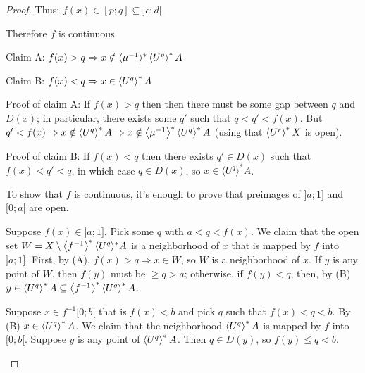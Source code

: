 \begin{proof}
Thus: $f(x)\in[p;q]\subseteq]c;d[$.

Therefore $f$ is continuous.

\begin{grayed}
Claim A: $f (x) > q \Rightarrow x \notin \langle \mu^{- 1}
\rangle^{\ast} \left\langle U^q\right\rangle ^{\ast} A$

Claim B: $f (x) < q \Rightarrow x \in \left\langle U^q\right\rangle ^{\ast} A$

Proof of claim A: If $f (x) > q$ then then there must be some gap between $q$
and $D (x)$; in particular, there exists some $q'$ such that $q < q' < f (x)$.
But $q' < f (x) \Rightarrow x \notin \left\langle U^q\right\rangle ^{\ast} A \Rightarrow x
\notin \left\langle \mu^{- 1}\right\rangle ^{\ast} \left\langle U^q\right\rangle ^{\ast} A$ (using that $\left\langle U^r\right\rangle ^{\ast}X$ is open).

Proof of claim B: If $f (x) < q$ then there exists $q' \in D (x)$ such that $f
(x) < q' < q$, in which case $q \in D (x)$, so $x \in \langle U^q
\rangle^{\ast} A$.

To show that $f$ is continuous, it's enough to prove that preimages of $] a ;
1]$ and $[0 ; a [$ are open.

Suppose $f (x) \in] a ; 1]$. Pick some $q$ with $a < q < f (x)$. We claim that
the open set $W = X \setminus \left\langle f^{- 1}\right\rangle ^{\ast} \langle U^q
\rangle^{\ast} A$ is a neighborhood of $x$ that is mapped by $f$ into $] a ;
1]$. First, by (A), $f (x) > q \Rightarrow x \in W$, so $W$ is a neighborhood
of $x$. If $y$ is any point of $W$, then $f (y)$ must be $\geq q > a$;
otherwise, if $f (y) < q$, then, by (B) $y \in \left\langle U^q\right\rangle ^{\ast} A
\subseteq \left\langle f^{- 1}\right\rangle ^{\ast} \left\langle U^q\right\rangle ^{\ast} A$.

Suppose $x \in f^{- 1} [0 ; b [$ that is $f (x) < b$ and pick $q$ such that $f
(x) < q < b$. By (B) $x \in \left\langle U^q\right\rangle ^{\ast} A$. We claim that the
neighborhood $\left\langle U^q\right\rangle ^{\ast} A$ is mapped by $f$ into $[0 ; b [$.
Suppose $y$ is any point of $\left\langle U^q\right\rangle ^{\ast} A$. Then $q \in D
(y)$, so $f (y) \leq q < b$.
\end{grayed}
\end{proof}